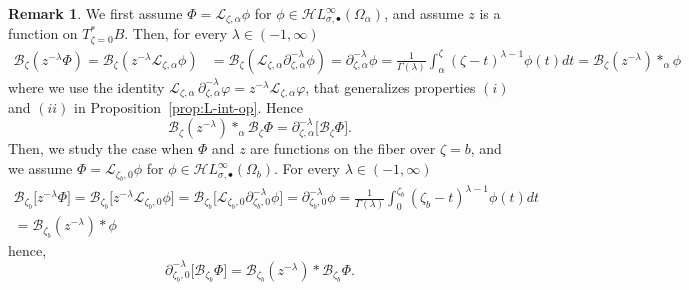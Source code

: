 \documentclass{article}
\newcommand{\singexp}[2]{\mathcal{H}L^\infty_{#1, #2}}
\newcommand{\singexpalg}[1]{\singexp{#1}{\bullet}}
\newcommand{\series}[1]{\tilde{#1}}
\newcommand{\fracderiv}[3]{\partial^{#1}_{#2, #3}}
\newcommand{\laplace}{\mathcal{L}}
\newcommand{\borel}{\mathcal{B}}
\theoremstyle{definition}
\newtheorem{remark}[definition]{Remark}
\theoremstyle{plain}
\newenvironment{verify}{\color{ForestGreen}}{\color{black}}
\begin{document}
\begin{verify}
\begin{remark}
We first assume $\Phi=\laplace_{\zeta,\alpha}\phi$ for $\phi\in\singexpalg{\sigma}(\Omega_\alpha)$, and assume $z$ is a function on $T^*_{\zeta=0}B$. Then, for every $\lambda\in (-1,\infty)$
\begin{align*}
    \borel_\zeta(z^{-\lambda}{\Phi})=\borel_\zeta(z^{-\lambda}\laplace_{\zeta,\alpha}\phi)&=\borel_\zeta(\laplace_{\zeta,\alpha}\partial_{\zeta,\alpha}^{-\lambda}\phi)=\partial_{\zeta,\alpha}^{-\lambda}\phi=\frac{1}{\Gamma(\lambda)}\int_{\alpha}^\zeta (\zeta-t)^{\lambda-1}\phi(t)dt=\borel_\zeta (z^{-\lambda})\ast_\alpha\phi
\end{align*}
where we use the identity $\laplace_{\zeta, \alpha}\,\fracderiv{-\lambda}{\zeta}{\alpha} \varphi = z^{-\lambda} \laplace_{\zeta, \alpha} \varphi$, that generalizes properties $(i)$ and $(ii)$ in Proposition~\ref{prop:L-int-op}. Hence \[\borel_\zeta (z^{-\lambda})\ast_\alpha\borel_\zeta{\Phi}=\fracderiv{-\lambda}{\zeta}{\alpha}\big[\borel_\zeta\Phi\big].\]
Then, we study the case when $\Phi$ and $z$ are functions on the fiber over $\zeta=b$, and we assume $\Phi=\laplace_{\zeta_b,0}\phi$ for $\phi\in\singexpalg{\sigma}(\Omega_b)$. For every $\lambda\in (-1,\infty)$
\begin{multline*}
    \borel_{\zeta_b}\big[z^{-\lambda}\Phi\big]=\borel_{\zeta_b}\big[z^{-\lambda}\laplace_{\zeta_b,0}\phi\big]=\borel_{\zeta_b}\big[\laplace_{\zeta_b,0}\partial_{\zeta_b,0}^{-\lambda}\phi\big]=\partial_{\zeta_b,0}^{-\lambda}\phi=\frac{1}{\Gamma(\lambda)}\int_{0}^{\zeta_b} (\zeta_b-t)^{\lambda-1}\phi(t)dt\\
    =\borel_{\zeta_b}(z^{-\lambda})\ast\phi
\end{multline*}
hence,  \[\partial_{\zeta_b,0}^{-\lambda}\big[\borel_{\zeta_b}\Phi\big]=\borel_{\zeta_b} (z^{-\lambda})\ast\borel_{\zeta_b}{\Phi}.\]
\end{remark}
\end{verify}
%
\end{document}
